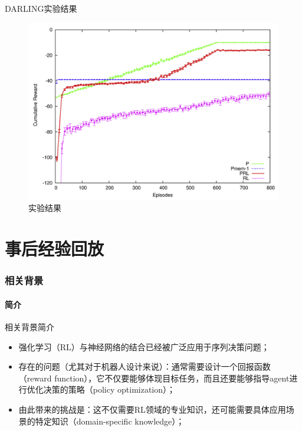 \documentclass[10pt]{beamer}
\begin{document}
	\begin{frame}{DARLING}{实验结果}
		\begin{figure}
			\centering
			\includegraphics[width=0.6\linewidth]{pictures/darling-expr}
			\caption{实验结果}
			\label{fig:darling-expr}
		\end{figure}
	\end{frame}

	\part{事后经验回放}\label{part:her}
	
	\section{相关背景}
	
	\subsection{简介}
	
	\begin{frame}{相关背景}{简介}
		\begin{itemize}
			\item<2-> 强化学习（RL）与神经网络的结合已经被广泛应用于序列决策问题；
			
			\item<3-> 存在的问题（尤其对于机器人设计来说）：通常需要设计一个回报函数（reward function），它不仅要能够体现目标任务，而且还要能够指导agent进行优化决策的策略（policy optimization）；
			
			\item<4-> 由此带来的挑战是：这不仅需要RL领域的专业知识，还可能需要具体应用场景的特定知识（domain-specific knowledge）；
			
		\end{itemize}
		
	\end{frame}
\end{document}
